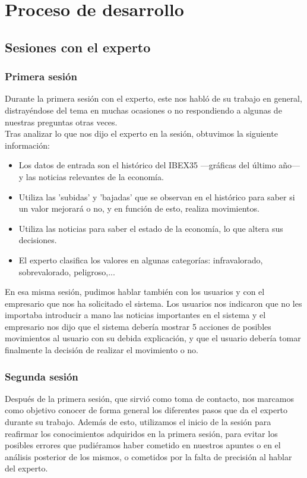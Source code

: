 \section{Proceso de desarrollo}
\subsection{Sesiones con el experto}
\subsubsection{Primera sesión}
Durante la primera sesión con el experto, este nos habló de su trabajo en general, distrayéndose del tema en muchas ocasiones o no respondiendo a algunas de nuestras preguntas otras veces.\\

Tras analizar lo que nos dijo el experto en la sesión, obtuvimos la siguiente información:\\
\begin{itemize}
\item Los datos de entrada son el histórico del IBEX35 ---gráficas del último año--- y las noticias relevantes de la economía.
\item Utiliza las 'subidas' y 'bajadas' que se observan en el histórico para saber si un valor mejorará o no, y en función de esto, realiza movimientos.
\item Utiliza las noticias para saber el estado de la economía, lo que altera sus decisiones.
\item El experto clasifica los valores en algunas categorías: infravalorado, sobrevalorado, peligroso,... 
\end{itemize}

En esa misma sesión, pudimos hablar también con los usuarios y con el empresario que nos ha solicitado el sistema. Los usuarios nos indicaron que no les importaba introducir a mano las noticias importantes en el sistema y el empresario nos dijo que el sistema debería mostrar 5 acciones de posibles movimientos al usuario con su debida explicación, y que el usuario debería tomar finalmente la decisión de realizar el movimiento o no.  

\subsubsection{Segunda sesión}
Después de la primera sesión, que sirvió como toma de contacto, nos marcamos como objetivo conocer de forma general los diferentes pasos que da el experto durante su trabajo. Además de esto, utilizamos el inicio de la sesión para reafirmar los conocimientos adquiridos en la primera sesión, para evitar los posibles errores que pudiéramos haber cometido en nuestros apuntes o en el análisis posterior de los mismos, o cometidos por la falta de precisión al hablar del experto.\\

